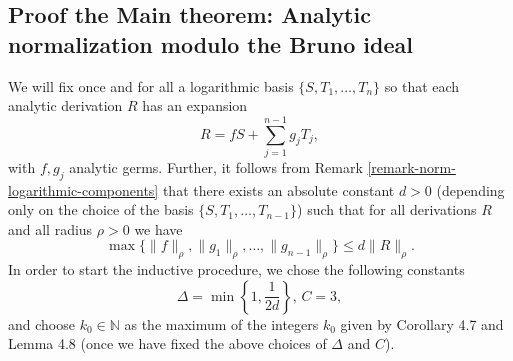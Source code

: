 \documentclass[10pt,twoside,reqno]{amsart}
\theoremstyle{remark}
\theoremstyle{remark}
\begin{document}
\subsection{Proof the Main theorem: Analytic normalization modulo the Bruno ideal}

We will fix once and for all a logarithmic basis $\{ S, T_1, \ldots, T_n
\}$ so that each analytic derivation $R$ has an expansion
\[ R = f S + \sum_{j = 1}^{n - 1} g_j T_j,\]
with $f, g_j$ analytic germs. Further, it follows from Remark
\ref{remark-norm-logarithmic-components} that there exists an absolute
constant $d > 0$ (depending only on the choice of the basis $\{ S, T_1,
\ldots, T_{n - 1} \}$) such that for all derivations $R$ and all radius $\rho
> 0$ we have
\begin{equation}
  \max \{ \| f \|_{\rho}, \| g_1 \|_{\rho}, \ldots, \| g_{n - 1} \|_{\rho} \}
  \leqslant d \| R \|_{\rho}. \label{estimates-coeffs}
\end{equation}
In order to start the inductive procedure, we chose the following
constants
\[ \text{$\Delta = \min \left\{ 1, \frac{1}{2 d} \right\}$, $C = 3$}, \]
and choose $k_0 \in \mathbb{N}$ as the maximum of the integers $k_0$ given by
Corollary 4.7 and Lemma 4.8 (once we have fixed the above choices of $\Delta$ and
$C$).
\end{document}
